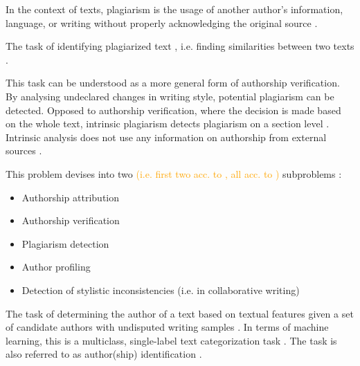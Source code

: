 \begin{definition}
    [Plagiarism]
    In the context of texts, plagiarism is the usage of another author's information, language, or writing without properly acknowledging the original source \cite{stein_intrinsic_2011}.
\end{definition}

\begin{definition}
    The task of identifying plagiarized text \cite{stein_intrinsic_2011}, i.e. finding similarities between two texts \cite{stamatatos_survey_2009}.
\end{definition}

\begin{definition}
    This task can be understood as a more general form of authorship verification.
    By analysing undeclared changes in writing style, potential plagiarism can be detected.
    Opposed to authorship verification, where the decision is made based on the whole text, 
    intrinsic plagiarism detects plagiarism on a section level \cite{stein_intrinsic_2011}.
    Intrinsic analysis does not use any information on authorship from external sources \cite{zangerle_overview_2024}.
\end{definition}

\begin{definition}
    This problem devises into two \textcolor{orange}{(i.e. first two acc. to \cite{stein_intrinsic_2011}, all acc. to \cite{stamatatos_survey_2009})} subproblems \cite{stein_intrinsic_2011}:
    \begin{itemize}
        \item Authorship attribution \cite{stein_intrinsic_2011}
        \item Authorship verification \cite{stein_intrinsic_2011,stamatatos_survey_2009}
        \item Plagiarism detection \cite{stamatatos_survey_2009}
        \item Author profiling \cite{stamatatos_survey_2009}
        \item Detection of stylistic inconsistencies (i.e. in collaborative writing) \cite{stamatatos_survey_2009}
    \end{itemize}
\end{definition}

\begin{definition}
    The task of determining the author of a text based on textual features 
    given a set of candidate authors with undisputed writing samples \cite{stein_intrinsic_2011,stamatatos_survey_2009}.
    In terms of machine learning, this is a multiclass, single-label text categorization task \cite{stamatatos_survey_2009}.
    The task is also referred to as author(ship) identification \cite{stamatatos_survey_2009}.
\end{definition}

